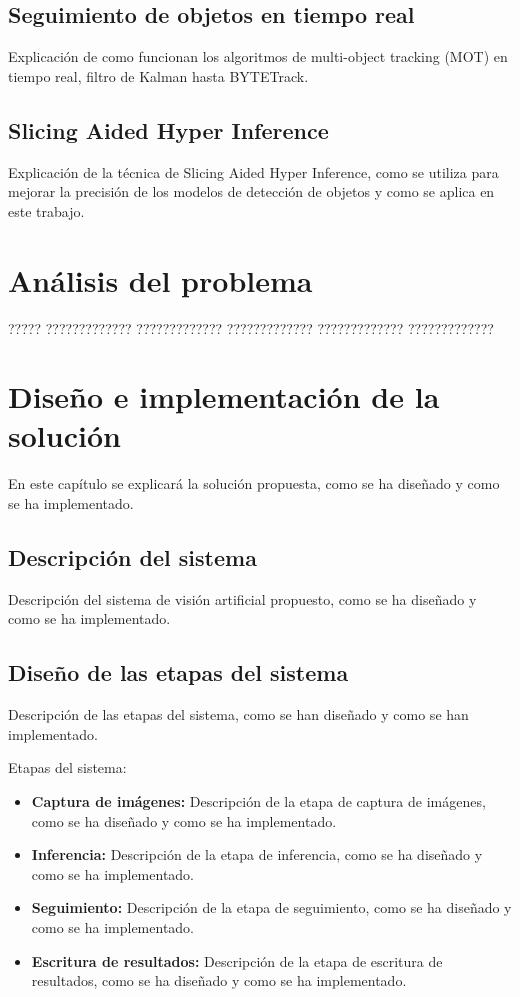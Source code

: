 \documentclass[11pt,spanish,listoffigures,listoftables]{tfgetsinf}
\begin{document}
\section{Seguimiento de objetos en tiempo real}
Explicación de como funcionan los algoritmos de multi-object tracking (MOT) en tiempo real, filtro de Kalman hasta BYTETrack.

\section{Slicing Aided Hyper Inference}
Explicación de la técnica de Slicing Aided Hyper Inference, como se utiliza para mejorar la precisión de los modelos de detección de objetos y como se aplica en este trabajo.

\chapter{Análisis del problema}

????? ????????????? ????????????? ????????????? ????????????? ????????????? 

\chapter{Diseño e implementación de la solución}
En este capítulo se explicará la solución propuesta, como se ha diseñado y como se ha implementado.

\section{Descripción del sistema}

Descripción del sistema de visión artificial propuesto, como se ha diseñado y como se ha implementado.

\section{Diseño de las etapas del sistema}

Descripción de las etapas del sistema, como se han diseñado y como se han implementado.

Etapas del sistema:
\begin{itemize}
   \item \textbf{Captura de imágenes:} Descripción de la etapa de captura de imágenes, como se ha diseñado y como se ha implementado.
   \item \textbf{Inferencia:} Descripción de la etapa de inferencia, como se ha diseñado y como se ha implementado.
   \item \textbf{Seguimiento:} Descripción de la etapa de seguimiento, como se ha diseñado y como se ha implementado.
   \item \textbf{Escritura de resultados:} Descripción de la etapa de escritura de resultados, como se ha diseñado y como se ha implementado.
\end{itemize}
\end{document}
